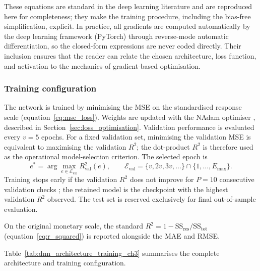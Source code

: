 These equations are standard in the deep learning literature
\citep{goodfellow2016deep} and are reproduced here for completeness; they
make the training procedure, including the bias-free simplification,
explicit.  In practice, all gradients are computed automatically by
the deep learning framework (PyTorch) through reverse-mode automatic
differentiation, so the closed-form expressions are never coded directly.
Their inclusion ensures that the reader can relate the chosen architecture,
loss function, and activation to the mechanics of gradient-based
optimisation.


\subsubsection{Training configuration}
\label{sec:training_configuration}

The network is trained by minimising the MSE on the
standardised response scale (equation~\eqref{eq:mse_loss}).  Weights are
updated with the NAdam optimiser \citep{dozat2016incorporating}, described
in Section~\ref{sec:loss_optimisation}.  Validation performance is
evaluated every $v = 5$ epochs.  For a fixed validation set, minimising
the validation MSE is equivalent to maximising the validation \ensuremath{R^2}; the
dot-product \ensuremath{R^2} is therefore used as the operational model-selection
criterion.  The selected epoch is
\begin{equation}
    e^{*} = \arg\max_{e \in \mathcal{E}_{\mathrm{val}}} R^2_{\mathrm{val}}(e),
    \qquad
    \mathcal{E}_{\mathrm{val}} = \{v, 2v, 3v, \dots\} \cap \{1, \dots, E_{\max}\}.
    \label{eq:validation_r2_epoch_selection_ch3}
\end{equation}
Training stops early if the validation \ensuremath{R^2} does not improve for $P = 10$
consecutive validation checks \citep{prechelt2012early}; the retained
model is the checkpoint with the highest validation \ensuremath{R^2} observed.  The test set is reserved
exclusively for final out-of-sample evaluation.

On the original monetary scale, the standard
$R^2 = 1 - \mathrm{SS}_{\mathrm{res}} / \mathrm{SS}_{\mathrm{tot}}$
(equation~\eqref{eq:r_squared}) is reported alongside the MAE and
RMSE.

Table~\ref{tab:dnn_architecture_training_ch3} summarises the complete
architecture and training configuration.

